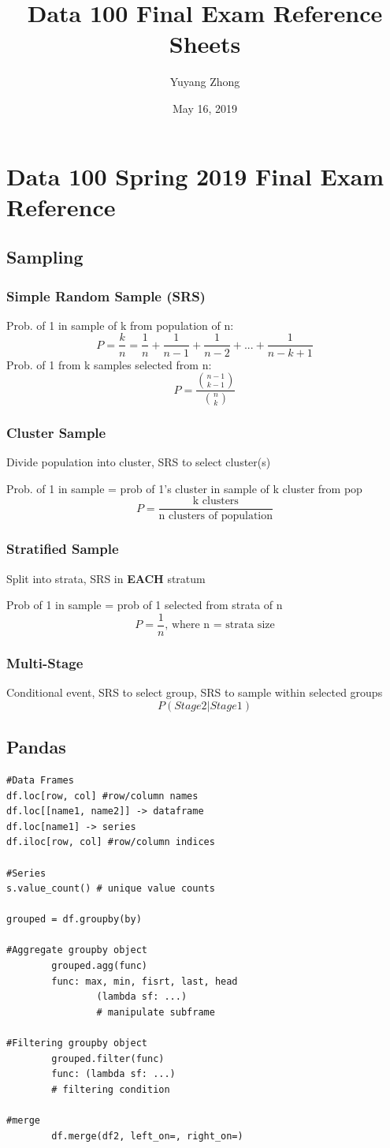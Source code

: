 \documentclass[8pt]{extarticle}
\title{Data 100 Final Exam Reference Sheets}
\author{Yuyang Zhong}
\date{May 16, 2019}
\begin{document}
\section*{Data 100 Spring 2019 Final Exam Reference}

\subsection*{Sampling}
\subsubsection*{Simple Random Sample (SRS)}
Prob. of 1 in sample of k from population of n:
$$ P = \frac{k}{n} = \frac{1}{n} + \frac{1}{n-1} + \frac{1}{n-2} + ... + \frac{1}{n-k+1}  $$
Prob. of 1 from k samples selected from n:
$$ P= \frac{{n-1\choose k-1}}{{n\choose k}} $$

\subsubsection*{Cluster Sample}
Divide population into cluster, SRS to select cluster(s)

Prob. of 1 in sample = prob of 1's cluster in sample of k cluster from pop
$$ P =\frac{\text{k clusters}}{\text{n  clusters of population}} $$


\subsubsection*{Stratified Sample}
Split into strata, SRS in \textbf{EACH} stratum

Prob of 1 in sample = prob of 1 selected from strata of n 
$$ P = \frac{1}{n} \text{, where n = strata size} $$

\subsubsection*{Multi-Stage}
Conditional event, SRS to select group, SRS to sample within selected groups
$$ P(Stage 2 | Stage 1) $$
\hline

\subsection*{Pandas}
\begin{verbatim}
#Data Frames
df.loc[row, col] #row/column names
df.loc[[name1, name2]] -> dataframe
df.loc[name1] -> series
df.iloc[row, col] #row/column indices

#Series
s.value_count() # unique value counts

grouped = df.groupby(by)
        
#Aggregate groupby object
        grouped.agg(func)
        func: max, min, fisrt, last, head
                (lambda sf: ...) 
                # manipulate subframe
                
#Filtering groupby object
        grouped.filter(func)
        func: (lambda sf: ...) 
        # filtering condition

#merge
        df.merge(df2, left_on=, right_on=)
\end{verbatim}
\hline
\end{document}
